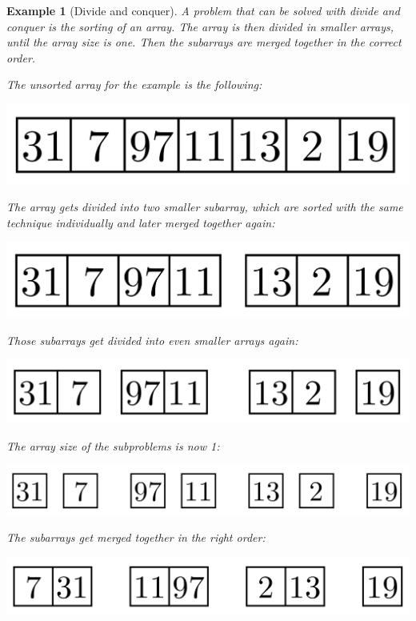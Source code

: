 \documentclass[a4paper, 11pt]{article}
\newtheorem*{example*}{Example}
\begin{document}
\begin{example*}[Divide and conquer]

A problem that can be solved with divide and conquer is the sorting of an array. The array is then divided in smaller arrays, until the array size is one. Then the subarrays are merged together in the correct order.

The unsorted array for the example is the following:
\begin{center}
\includegraphics[scale=0.125]{images/merge1.png}
\end{center}

The array gets divided into two smaller subarray, which are sorted with the same technique individually and later merged together again:
\begin{center}
\includegraphics[scale=0.125]{images/merge2.png}
\end{center}

Those subarrays get divided into even smaller arrays again:
\begin{center}
\includegraphics[scale=0.125]{images/merge3.png}
\end{center}

The array size of the subproblems is now 1:
\begin{center}
\includegraphics[scale=0.125]{images/merge4.png}
\end{center}

The subarrays get merged together in the right order:
\begin{center}
\includegraphics[scale=0.125]{images/merge5.png}
\end{center}


\end{example*}
\end{document}
